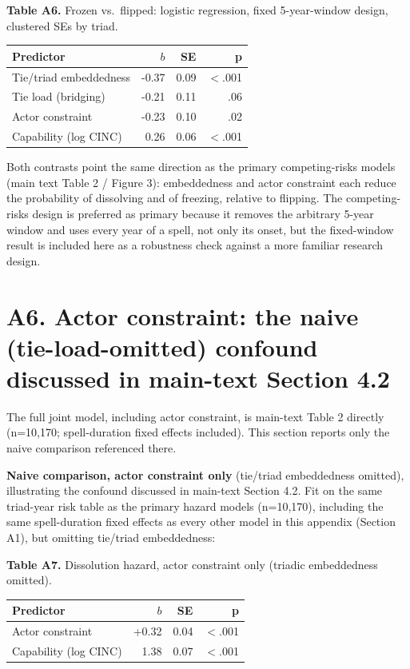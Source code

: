 \documentclass[Afour,sageh,times,doublespace]{sagej}
\begin{document}
\begin{table}[t]
\centering
\textbf{Table A6.} Frozen vs.\ flipped: logistic regression, fixed 5-year-window design, clustered SEs by triad.

\vspace{4pt}
{\small\sf
\begin{tabular}{lrrr}
\toprule
Predictor & $b$ & SE & p\\
\midrule
Tie/triad embeddedness & -0.37 & 0.09 & $<$.001\\
Tie load (bridging) & -0.21 & 0.11 & .06\\
Actor constraint & -0.23 & 0.10 & .02\\
Capability (log CINC) & 0.26 & 0.06 & $<$.001\\
\bottomrule
\end{tabular}
\par}
\end{table}

Both contrasts point the same direction as the primary competing-risks models (main text Table 2 / Figure 3): embeddedness and actor constraint each reduce the probability of dissolving and of freezing, relative to flipping. The competing-risks design is preferred as primary because it removes the arbitrary 5-year window and uses every year of a spell, not only its onset, but the fixed-window result is included here as a robustness check against a more familiar research design.

\section*{A6. Actor constraint: the naive (tie-load-omitted) confound discussed in main-text Section 4.2}

The full joint model, including actor constraint, is main-text Table 2 directly (n=10,170; spell-duration fixed effects included). This section reports only the naive comparison referenced there.

\textbf{Naive comparison, actor constraint only} (tie/triad embeddedness omitted), illustrating the confound discussed in main-text Section 4.2. Fit on the same triad-year risk table as the primary hazard models (n=10,170), including the same spell-duration fixed effects as every other model in this appendix (Section A1), but omitting tie/triad embeddedness:

\begin{table}[t]
\centering
\textbf{Table A7.} Dissolution hazard, actor constraint only (triadic embeddedness omitted).

\vspace{4pt}
{\small\sf
\begin{tabular}{lrrr}
\toprule
Predictor & $b$ & SE & p\\
\midrule
Actor constraint & +0.32 & 0.04 & $<$.001\\
Capability (log CINC) & 1.38 & 0.07 & $<$.001\\
\bottomrule
\end{tabular}
\par}
\end{table}
\end{document}
